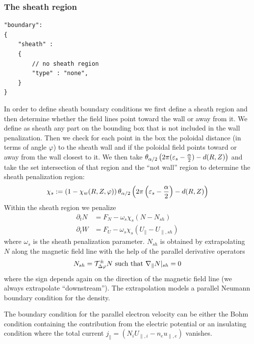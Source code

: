 \subsubsection{The sheath region}\label{sec:sheath}
\begin{verbatim}
"boundary":
{
    "sheath" :
    {
        // no sheath region
        "type" : "none",
    }
}
\end{verbatim}
In order to define sheath boundary conditions we first define a sheath region
and then determine whether the field lines point toward the wall or away from it.
We define as sheath any part on the bounding box that is not included in the wall
penalization. Then we check for each point in the box the poloidal distance (in
terms of angle $\varphi$) to the sheath wall and if the poloidal field points
toward or away from the wall closest to it.
We then take $\theta_{\alpha/2}\left( 2\pi(\varepsilon_s - \frac{\alpha}{2}) - d(R,Z)\right)$
and take the set intersection of that region and the ``not wall'' region to
determine the sheath penalization region:
\begin{align}\label{eq:sheath}
\chi_s := \left(1-\chi_w(R,Z,\varphi)\right) \theta_{\alpha/2}\left( 2\pi\left(\varepsilon_s - \frac{\alpha}{2}\right) - d(R,Z)\right)
\end{align}
Within the sheath region we penalize
\begin{subequations} \label{eq:sheath_penalization}
\begin{align}
    \partial_t N &= F_N -\omega_s \chi_s \left(N-N_{sh}\right)\\
    \partial_t W &= F_U -\omega_s \chi_s \left(U_\parallel-U_{\parallel,sh}\right)
\end{align}
\end{subequations}
where $\omega_s$ is the sheath penalization parameter.
$N_{sh}$ is obtained by extrapolating $N$ along the magnetic field line with
the help of the parallel derivative operators
\begin{align}
    N_{sh} = \mathcal T^\pm_{\Delta\varphi} N \text{ such that } \nabla_\parallel N|_{sh} = 0
\end{align}
where the sign depends again on the direction of the magnetic field line (we always extrapolate ``downstream'').
The extrapolation models a parallel Neumann boundary condition for the density.

The boundary condition for the parallel electron velocity can be either the Bohm condition containing the contribution from the electric potential or
an insulating condition where the total current $j_\parallel =  (N_i U_{\parallel,i} - n_e u_{\parallel,e})$ vanishes.

